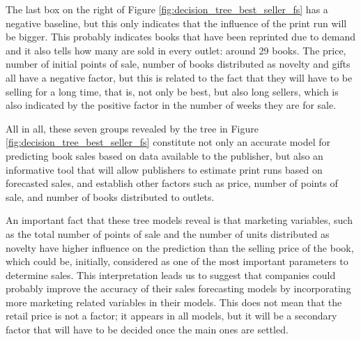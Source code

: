 \documentclass[a4paper,10pt,twocolumn,preprint,3p]{elsarticle}
\begin{document}
The last box on the right of Figure
\ref{fig:decision_tree_best_seller_fs} has a negative baseline, but
this only indicates that the influence of the print run will be
bigger. This probably indicates books that have been reprinted due to
demand and it also tells how many are sold in every outlet: around 29
books. The price, number of initial points of sale, number of books
distributed as novelty and gifts all have a negative factor, but this
is related to the fact that they will have to be selling for a long
time, that is, not only be best, but also long sellers, which is also
indicated by the positive factor in the number of weeks they are for
sale. 

All in all, these seven groups revealed by the tree in Figure
\ref{fig:decision_tree_best_seller_fs} constitute not only an accurate
model for predicting book sales based on data available to the
publisher, but also an informative tool that will allow publishers to
estimate print runs based on forecasted sales, and establish other
factors such as price, number of points of sale, and number of books
distributed to outlets. 

An important fact that these tree models reveal is that marketing
variables, such as the total number of points of sale and the number
of units distributed as novelty have higher influence on the
prediction than the selling price of the book, which could be,
initially, considered as one of the most important parameters to
determine sales. This interpretation leads us to suggest that
companies could probably improve the accuracy of their sales
forecasting models by incorporating more marketing related variables
in their models. This does not mean that the retail price is not a
factor; it appears in all models, but it will be a secondary factor
that will have to be decided once the main ones are settled. 

\begin{figure*}[!ht] 
\begin{center}
\caption{Decision tree built by the M5P method for the best seller publishing 
	company including all pre-sales features.}
\label{fig:decision_tree_best_seller}
\end{center}
\end{figure*}


\begin{figure*}[!ht] 
\begin{center}
\caption{Decision tree built by the M5P method for the best seller
  publishing company using  the subset of features selected by the
  {\sf ReliefAttributeEval} method.} 
\label{fig:decision_tree_best_seller_fs}
\end{center}
\end{figure*}
\end{document}
